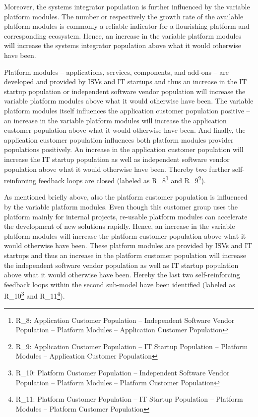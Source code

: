 Moreover, the systems integrator population is further influenced by the variable platform modules. The number or respectively the growth rate of the available platform modules is commonly a reliable indicator for a flourishing platform and corresponding ecosystem. Hence, an increase in the variable platform modules will increase the systems integrator population above what it would otherwise have been.

Platform modules -- applications, services, components, and add-ons -- are developed and provided by \acp{ISV} and \ac{IT} startups and thus an increase in the \ac{IT} startup population or independent software vendor population will increase the variable platform modules above what it would otherwise have been. The variable platform modules itself influences the application customer population positive -- an increase in the variable platform modules will increase the application customer population above what it would otherwise have been. And finally, the application customer population influences both platform modules provider populations positively. An increase in the application customer population will increase the \ac{IT} startup population as well as independent software vendor population above what it would otherwise have been. Thereby two further self-reinforcing feedback loops are closed (labeled as R\_8\footnote{R\_8: Application Customer Population -- Independent Software Vendor Population -- Platform Modules -- Application Customer Population} and R\_9\footnote{R\_9: Application Customer Population -- \ac{IT} Startup Population -- Platform Modules -- Application Customer Population}).

As mentioned briefly above, also the platform customer population is influenced by the variable platform modules. Even though this customer group uses the platform mainly for internal projects, re-usable platform modules can accelerate the development of new solutions rapidly. Hence, an increase in the variable platform modules will increase the platform customer population above what it would otherwise have been. These platform modules are provided by \acp{ISV} and \ac{IT} startups and thus an increase in the platform customer population will increase the independent software vendor population as well as \ac{IT} startup population above what it would otherwise have been. Hereby the last two self-reinforcing feedback loops within the second sub-model have been identified (labeled as R\_10\footnote{R\_10: Platform Customer Population -- Independent Software Vendor Population -- Platform Modules -- Platform Customer Population} and R\_11\footnote{R\_11: Platform Customer Population -- \ac{IT} Startup Population -- Platform Modules -- Platform Customer Population}).

